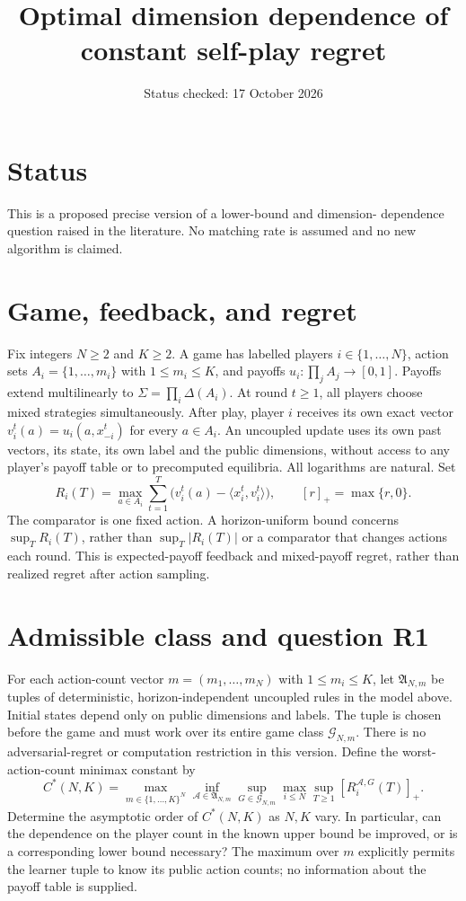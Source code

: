 \documentclass[11pt]{article}
\title{Optimal dimension dependence of constant self-play regret}
\author{}
\date{Status checked: 17 October 2026}
\begin{document}
\maketitle
\section*{Status}
This is a proposed precise version of a lower-bound and dimension-
dependence question raised in the literature. No matching rate is
assumed and no new algorithm is claimed.
\section*{Game, feedback, and regret}
Fix integers $N\geq 2$ and $K\geq 2$. A game has labelled players
$i\in\{1,\ldots,N\}$, action sets $A_i=\{1,\ldots,m_i\}$ with
$1\leq m_i\leq K$, and payoffs $u_i:\prod_j A_j\to[0,1]$.
Payoffs extend multilinearly to $\Sigma=\prod_i\Delta(A_i)$.
At round $t\geq1$, all players choose mixed strategies simultaneously.
After play, player $i$ receives its own exact vector
$v_i^t(a)=u_i(a,x_{-i}^t)$ for every $a\in A_i$.
An uncoupled update uses its own past vectors, its state, its own label and
the public dimensions, without access to any player's payoff table or to
precomputed equilibria. All logarithms are natural. Set
\[
 R_i(T)=\max_{a\in A_i}\sum_{t=1}^T
  \bigl(v_i^t(a)-\langle x_i^t,v_i^t\rangle\bigr),
 \qquad [r]_+=\max\{r,0\}.
\]
The comparator is one fixed action. A horizon-uniform bound concerns
$\sup_T R_i(T)$, rather than $\sup_T|R_i(T)|$ or a comparator that changes
actions each round. This is expected-payoff feedback and mixed-payoff
regret, rather than realized regret after action sampling.

\section*{Admissible class and question R1}
For each action-count vector $m=(m_1,\ldots,m_N)$ with $1\leq m_i\leq K$,
let $\mathfrak A_{N,m}$ be tuples of deterministic, horizon-independent
uncoupled rules in the model above. Initial states depend only on public
dimensions and labels. The tuple is chosen before the game and must
work over its entire game class $\mathcal G_{N,m}$.
There is no adversarial-regret or computation restriction in this version.
Define the worst-action-count minimax constant by
\[
 C^*(N,K)=
 \max_{m\in\{1,\ldots,K\}^N}
 \inf_{\mathcal A\in\mathfrak A_{N,m}}
 \sup_{G\in\mathcal G_{N,m}}\max_{i\leq N}\sup_{T\geq1}
       [R_i^{\mathcal A,G}(T)]_+.
\]
Determine the asymptotic order of $C^*(N,K)$ as $N,K$ vary.
In particular, can the dependence on the player count in the known
upper bound be improved, or is a corresponding lower bound necessary?
The maximum over $m$ explicitly permits the learner tuple to know its
public action counts; no information about the payoff table is supplied.
\end{document}
